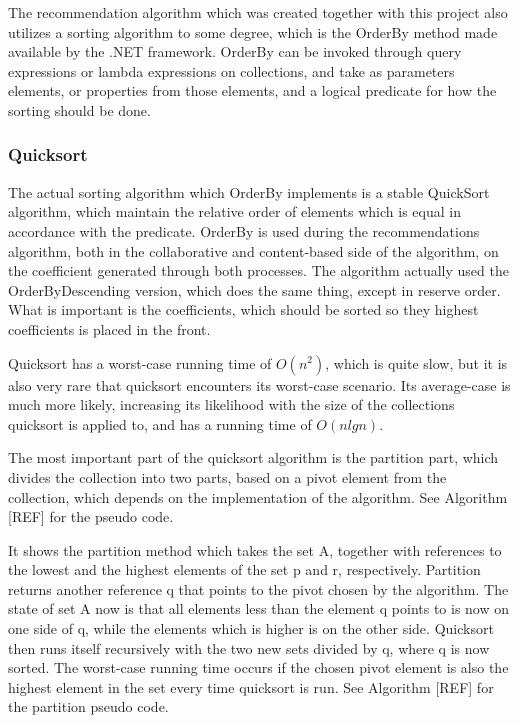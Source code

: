 The recommendation algorithm which was created together with this project also utilizes a sorting algorithm to some degree, which is the OrderBy method made available by the .NET framework. OrderBy can be invoked through query expressions or lambda expressions on collections, and take as parameters elements, or properties from those elements, and a logical predicate for how the sorting should be done. \cite{AlgoAnal1}

\subsubsection{Quicksort}

The actual sorting algorithm which OrderBy implements is a stable QuickSort algorithm, which maintain the relative order of elements which is equal in accordance with the predicate. OrderBy is used during the recommendations algorithm, both in the collaborative and content-based side of the algorithm, on the coefficient generated through both processes. The algorithm actually used the OrderByDescending version, which does the same thing, except in reserve order. What is important is the coefficients, which should be sorted so they highest coefficients is placed in the front.

Quicksort has a worst-case running time of $O(n^2)$, which is quite slow, but it is also very rare that quicksort encounters its worst-case scenario. Its average-case is much more likely, increasing its likelihood with the size of the collections quicksort is applied to, and has a running time of $O(nlgn)$.

The most important part of the quicksort algorithm is the partition part, which divides the collection into two parts, based on a pivot element from the collection, which depends on the implementation of the algorithm. See Algorithm [REF] for the pseudo code.



It shows the partition method which takes the set A, together with references to the lowest and the highest elements of the set p and r, respectively. Partition returns another reference q that points to the pivot chosen by the algorithm. The state of set A now is that all elements less than the element q points to is now on one side of q, while the elements which is higher is on the other side. Quicksort then runs itself recursively with the two new sets divided by q, where q is now sorted. The worst-case running time occurs if the chosen pivot element is also the highest element in the set every time quicksort is run. See Algorithm [REF] for the partition pseudo code.



